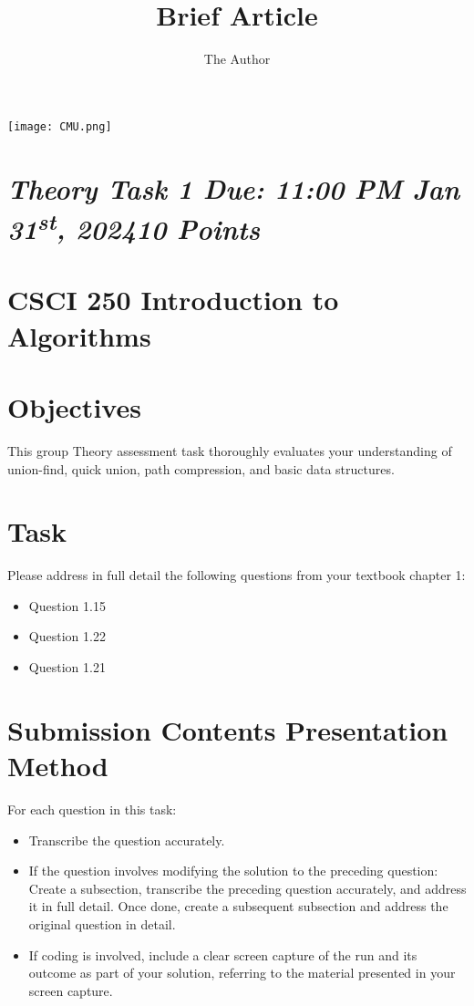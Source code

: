 \documentclass{article}
\title{Brief Article}
\author{The Author}
\begin{document}
\begin{minipage}{\linewidth}
  \centering
  \texttt{[image: CMU.png]}
  \section*{\emph{\bf Theory Task 1 \hspace{0.2 cm} Due: 11:00 PM Jan 31\textsuperscript{st}, 2024\hspace{0.2cm}10 Points}}
  \section*{CSCI 250 Introduction to Algorithms}
\end{minipage}

\section*{Objectives}
This group Theory assessment task thoroughly evaluates your understanding of union-find, quick union, path compression, and basic data structures.

\section*{Task}
Please address in full detail the following questions from your textbook chapter 1:

\begin{itemize}
  \item Question 1.15
  \item Question 1.22
  \item Question 1.21
\end{itemize}

\section*{Submission Contents Presentation Method}
For each question in this task:
\begin{itemize}
  \item Transcribe the question accurately.
  \item If the question involves modifying the solution to the preceding question:
  \subitem Create a subsection, transcribe the preceding question accurately, and address it in full detail.
  \subitem Once done, create a subsequent subsection and address the original question in detail.
  \item If coding is involved, include a clear screen capture of the run and its outcome as part of your solution, referring to the material presented in your screen capture.
\end{itemize}
\end{document}
